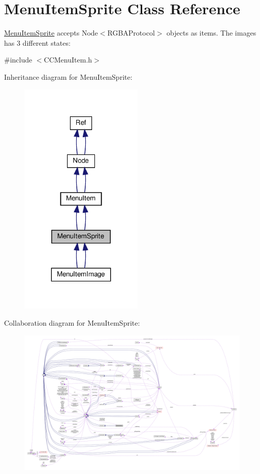 \hypertarget{classMenuItemSprite}{}\section{Menu\+Item\+Sprite Class Reference}
\label{classMenuItemSprite}


\hyperlink{classMenuItemSprite}{Menu\+Item\+Sprite} accepts Node$<$\+R\+G\+B\+A\+Protocol$>$ objects as items. The images has 3 different states\+:  




{\ttfamily \#include $<$C\+C\+Menu\+Item.\+h$>$}



Inheritance diagram for Menu\+Item\+Sprite\+:
\nopagebreak
\begin{figure}[H]
\begin{center}
\leavevmode
\includegraphics[width=167pt]{classMenuItemSprite__inherit__graph}
\end{center}
\end{figure}


Collaboration diagram for Menu\+Item\+Sprite\+:
\nopagebreak
\begin{figure}[H]
\begin{center}
\leavevmode
\includegraphics[width=350pt]{classMenuItemSprite__coll__graph}
\end{center}
\end{figure}
